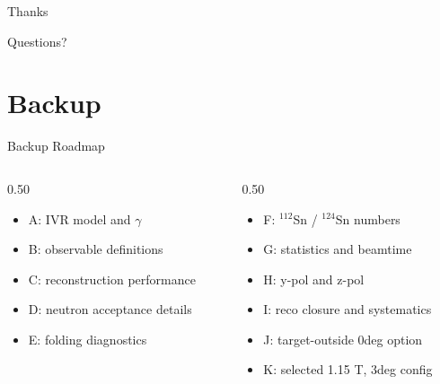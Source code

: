 \documentclass[aspectratio=169]{beamer}
\newcommand{\gpar}{\gamma}
\begin{document}
\begin{frame}
  \centering
  \Huge Thanks

  \vspace{0.6cm}
  \Large Questions?
\end{frame}

\appendix
\section*{Backup}

\begin{frame}{Backup Roadmap}
  \small
  \begin{columns}[T,onlytextwidth]
    \begin{column}{0.50\textwidth}
      \begin{itemize}
        \item A: IVR model and $\gpar$
        \item B: observable definitions
        \item C: reconstruction performance
        \item D: neutron acceptance details
        \item E: folding diagnostics
      \end{itemize}
    \end{column}
    \begin{column}{0.50\textwidth}
      \begin{itemize}
        \item F: $^{112}$Sn / $^{124}$Sn numbers
        \item G: statistics and beamtime
        \item H: y-pol and z-pol
        \item I: reco closure and systematics
        \item J: target-outside 0deg option
        \item K: selected 1.15 T, 3deg config
      \end{itemize}
    \end{column}
  \end{columns}
\end{frame}
\end{document}

